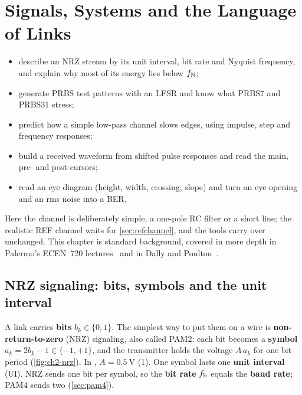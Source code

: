 \chapter{Signals, Systems and the Language of Links}\label{ch:signals}

\begin{objectives}
\begin{itemize}
  \item describe an NRZ stream by its unit interval, bit rate and Nyquist frequency, and explain why most of its energy lies below $f_\mathrm{N}$;
  \item generate PRBS test patterns with an LFSR and know what PRBS7 and PRBS31 stress;
  \item predict how a simple low-pass channel slows edges, using impulse, step and frequency responses;
  \item build a received waveform from shifted pulse responses and read the main, pre- and post-cursors;
  \item read an eye diagram (height, width, crossing, slope) and turn an eye opening and an rms noise into a BER.
\end{itemize}
\end{objectives}

Here the channel is deliberately simple, a one-pole RC filter or a short line; the realistic REF channel waits for \cref{sec:refchannel}, and the tools carry over unchanged. This chapter is standard background, covered in more depth in Palermo's ECEN~720 lectures~\cite{palermo720,palermo720ch} and in Dally and Poulton~\cite{dally1998}.

\section{NRZ signaling: bits, symbols and the unit interval}\label{sec:nrz}
A link carries \textbf{bits} $b_k \in \{0,1\}$. The simplest way to put them on a wire is \textbf{non-return-to-zero} (NRZ) signaling, also called PAM2: each bit becomes a \textbf{symbol} $a_k = 2b_k - 1 \in \{-1,+1\}$, and the transmitter holds the voltage $A\,a_k$ for one bit period (\cref{fig:ch2-nrz}). In \OS{}, $A = \qty{0.5}{\volt}$ (\qty{1}{\Vppd}). One symbol lasts one \textbf{unit interval} (UI). NRZ sends one bit per symbol, so the \textbf{bit rate} $f_\mathrm{b}$ equals the \textbf{baud rate}; PAM4 sends two (\cref{sec:pam4}).

